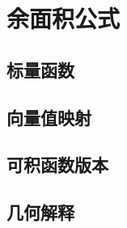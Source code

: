\section{余面积公式}
\label{b1:sec:1802}


\subsection{标量函数}
\label{b1:subsec:180201}

\subsection{向量值映射}
\label{b1:subsec:180202}

\subsection{可积函数版本}
\label{b1:subsec:180203}

\subsection{几何解释}
\label{b1:subsec:180204}


